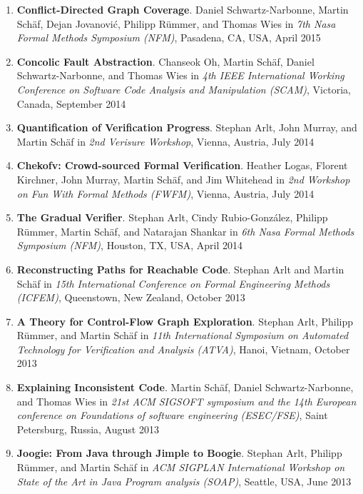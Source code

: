 \begin{enumerate}
\item \textbf{Conflict-Directed Graph Coverage}.
Daniel Schwartz-Narbonne, Martin Sch\"af, Dejan Jovanovi\'c, Philipp R\"ummer,
and Thomas Wies in \emph{7th Nasa Formal
Methods Symposium (NFM)}, Pasadena, CA, USA, April 2015


\item \textbf{Concolic Fault Abstraction}.  
Chanseok Oh, Martin Sch\"af, Daniel Schwartz-Narbonne, and Thomas Wies in
\emph{4th IEEE International Working Conference on Software Code Analysis and
Manipulation (SCAM)}, Victoria, Canada, September 2014

\item \textbf{Quantification of Verification Progress}.
Stephan Arlt, John Murray, and Martin Sch\"af in \emph{2nd Verisure Workshop},
Vienna, Austria, July 2014


\item \textbf{Chekofv: Crowd-sourced Formal Verification}.
Heather Logas, Florent Kirchner, John Murray, Martin Sch\"af, and Jim Whitehead
in \emph{2nd Workshop on Fun With Formal Methods (FWFM)}, Vienna, Austria, July
2014


\item \textbf{The Gradual Verifier}.
Stephan Arlt, Cindy Rubio-Gonz\'alez, Philipp R\"ummer,
Martin Sch\"af, and Natarajan Shankar in \emph{6th Nasa Formal Methods
Symposium (NFM)}, Houston, TX, USA, April 2014


\item \textbf{Reconstructing Paths for Reachable Code}.
Stephan Arlt and  Martin Sch\"af in \emph{15th International Conference on
Formal Engineering Methods (ICFEM)}, Queenstown, New Zealand, October 2013


\item \textbf{A Theory for Control-Flow Graph Exploration}.
Stephan Arlt, Philipp R\"ummer, and  Martin Sch\"af in \emph{11th International
Symposium on Automated Technology for Verification and Analysis (ATVA)},
Hanoi, Vietnam, October 2013

\item \textbf{Explaining Inconsistent Code}.  
Martin Sch\"af, Daniel Schwartz-Narbonne, and Thomas Wies in \emph{21st ACM
SIGSOFT symposium and the 14th European conference on Foundations of software
engineering (ESEC/FSE)}, Saint Petersburg, Russia, August 2013


\item \textbf{Joogie: From Java through Jimple to Boogie}. Stephan
Arlt, Philipp R\"ummer, and  Martin Sch\"af  in \emph{ ACM SIGPLAN International Workshop 
on State of the Art in Java Program analysis (SOAP)}, Seattle, USA, June 2013



\end{enumerate}
